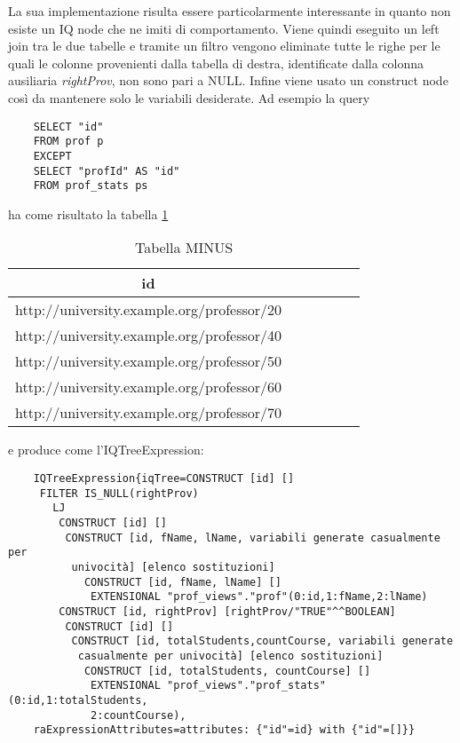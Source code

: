 La sua implementazione risulta essere particolarmente interessante in quanto non esiste un IQ node che ne imiti di comportamento. Viene quindi eseguito un left join tra le due
tabelle e tramite un filtro vengono eliminate tutte le righe per le quali le colonne provenienti dalla tabella di destra, identificate dalla colonna ausiliaria \textit{rightProv},
non sono pari a NULL. Infine viene usato un construct node così da mantenere solo le variabili desiderate. Ad esempio la query
\begin{verbatim}
    SELECT "id"
    FROM prof p
    EXCEPT
    SELECT "profId" AS "id"
    FROM prof_stats ps 
\end{verbatim}
ha come risultato la tabella \ref{tab:minus}
\begin{table}[h]
    \centering
    \caption{Tabella MINUS}
    \label{tab:minus}
    \begin{tabular}{ | c | c | c | c | c | c |}
        \hline
        id                                         \\ \hline
        http://university.example.org/professor/20 \\ \hline
        http://university.example.org/professor/40 \\ \hline
        http://university.example.org/professor/50 \\ \hline
        http://university.example.org/professor/60 \\ \hline
        http://university.example.org/professor/70 \\
        \hline
    \end{tabular}
\end{table}

\noindent
e produce come l'IQTreeExpression:
\begin{verbatim}
    IQTreeExpression{iqTree=CONSTRUCT [id] []
     FILTER IS_NULL(rightProv)
       LJ
        CONSTRUCT [id] []
         CONSTRUCT [id, fName, lName, variabili generate casualmente per
          univocità] [elenco sostituzioni]
            CONSTRUCT [id, fName, lName] []
             EXTENSIONAL "prof_views"."prof"(0:id,1:fName,2:lName)
        CONSTRUCT [id, rightProv] [rightProv/"TRUE"^^BOOLEAN]
         CONSTRUCT [id] []
          CONSTRUCT [id, totalStudents,countCourse, variabili generate 
           casualmente per univocità] [elenco sostituzioni]
            CONSTRUCT [id, totalStudents, countCourse] []
             EXTENSIONAL "prof_views"."prof_stats"(0:id,1:totalStudents,
             2:countCourse),
    raExpressionAttributes=attributes: {"id"=id} with {"id"=[]}}
\end{verbatim}

